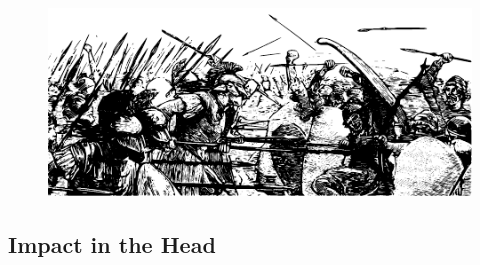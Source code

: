 \documentclass[12pt]{book}  %
\begin{document}
\begin{figure}[h]
    \centering
    \includegraphics[width=\textwidth]{./images/combat12.pdf}
\end{figure}

\subsection{Impact in the Head}
\end{document}
